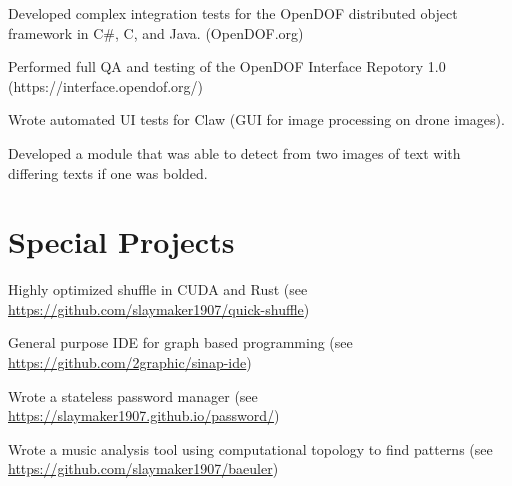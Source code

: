 \documentclass[letterpaper]{deedy-resume} %
\begin{document}
\begin{minipage}[t]{0.64\textwidth}

\begin{tightitemize}
\item Developed complex integration tests for the OpenDOF distributed object framework in C\#, C, and Java. (OpenDOF.org)
\item Performed full QA and testing of the OpenDOF Interface Repotory 1.0 (https://interface.opendof.org/)
\end{tightitemize}

\sectionspace



\begin{tightitemize}
\item Wrote automated UI tests for Claw (GUI for image processing on drone images).
\item Developed a module that was able to detect from two images of text with differing texts if one was bolded.
\end{tightitemize}

\sectionspace %



\section{Special Projects}
\vspace{\topsep} %
\begin{tightitemize}
	\item Highly optimized shuffle in CUDA and Rust (see \url{https://github.com/slaymaker1907/quick-shuffle})
	\item General purpose IDE for graph based programming (see \url{https://github.com/2graphic/sinap-ide})
	\item Wrote a stateless password manager (see \url{https://slaymaker1907.github.io/password/})
	\item Wrote a music analysis tool using computational topology to find patterns (see \url{https://github.com/slaymaker1907/baeuler})
\end{tightitemize}

\end{minipage} %
\end{document}
